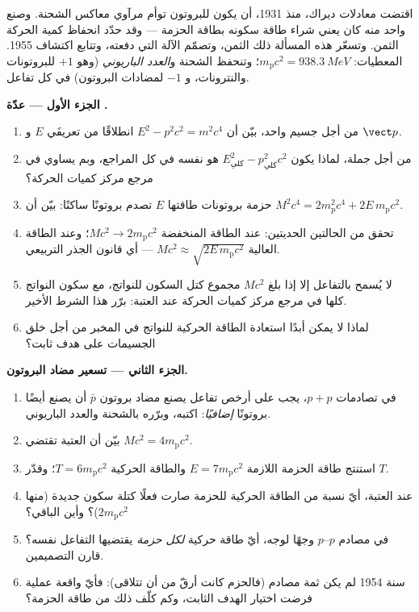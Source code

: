 \begin{problem}\label{pb:b3:relativistic-dynamics:1}
اقتضت معادلات ديراك، منذ 1931، أن يكون للبروتون توأم مرآوي
معاكس الشحنة. وصنع واحد منه كان يعني شراء طاقة سكونه بطاقة
الحزمة --- وقد حدّد انحفاظ كمية الحركة الثمن. وتسعّر هذه المسألة
ذلك الثمن، وتصمّم الآلة التي دفعته، وتتابع اكتشاف
1955. المعطيات: $m_{\text{p}}c^2 = \qty{938.3}{MeV}$؛ وتنحفظ الشحنة
و\emph{العدد الباريوني} (وهو $+1$ للبروتونات والنترونات، و $-1$ لمضادات البروتون)
في كل تفاعل.

\medskip\noindent\textbf{الجزء الأول --- عدّة .}
\begin{enumerate}
  \item من أجل جسيم واحد، بيّن أن $E^2 - p^2c^2 = m^2c^4$ انطلاقًا من
        تعريفَي $E$ و $\vect p$.
  \item من أجل جملة، لماذا يكون $E_{\text{كلي}}^2 -
        p_{\text{كلي}}^2c^2$ هو نفسه في كل المراجع، وبم
        يساوي في مرجع مركز كميات الحركة؟
  \item حزمة بروتونات طاقتها $E$ تصدم بروتونًا ساكنًا: بيّن أن
        $M^2c^4 = 2m_{\text{p}}^2c^4 + 2E\,m_{\text{p}}c^2$.
  \item تحقق من الحالتين الحديتين: عند الطاقة المنخفضة $Mc^2 \to
        2m_{\text{p}}c^2$؛ وعند الطاقة العالية $Mc^2 \approx
        \sqrt{2E\,m_{\text{p}}c^2}$ --- أي قانون الجذر التربيعي.
  \item لا يُسمح بالتفاعل إلا إذا بلغ $Mc^2$ مجموع كتل
        السكون للنواتج، مع سكون النواتج كلها في
        مرجع مركز كميات الحركة عند العتبة: برّر هذا الشرط
        الأخير.
  \item لماذا لا يمكن أبدًا استعادة الطاقة الحركية للنواتج في
        المخبر من أجل خلق الجسيمات على هدف ثابت؟
\end{enumerate}

\medskip\noindent\textbf{الجزء الثاني --- تسعير مضاد البروتون.}
\begin{enumerate}[resume]
  \item في تصادمات $p + p$، يجب على أرخص تفاعل يصنع
        مضاد بروتون $\bar p$ أن يصنع أيضًا بروتونًا \emph{إضافيًا}:
        اكتبه، وبرّره بالشحنة والعدد الباريوني.
  \item بيّن أن العتبة تقتضي $Mc^2 = 4m_{\text{p}}c^2$.
  \item استنتج طاقة الحزمة اللازمة $E = 7m_{\text{p}}c^2$ والطاقة
        الحركية $T = 6m_{\text{p}}c^2$؛ وقدّر $T$.
  \item عند العتبة، أيّ نسبة من الطاقة الحركية للحزمة
        صارت فعلًا كتلة سكون جديدة (منها $2m_{\text{p}}c^2$)؟
        وأين الباقي؟
  \item في مصادم $p$--$p$ وجهًا لوجه، أيّ طاقة حركية
        \emph{لكل حزمة} يقتضيها التفاعل نفسه؟ قارن
        التصميمين.
  \item سنة 1954 لم يكن ثمة مصادم (فالحزم كانت أرقّ من أن
        تتلاقى): فأيّ واقعة عملية فرضت اختيار الهدف الثابت،
        وكم كلّف ذلك من طاقة الحزمة؟
\end{enumerate}


\end{problem}
